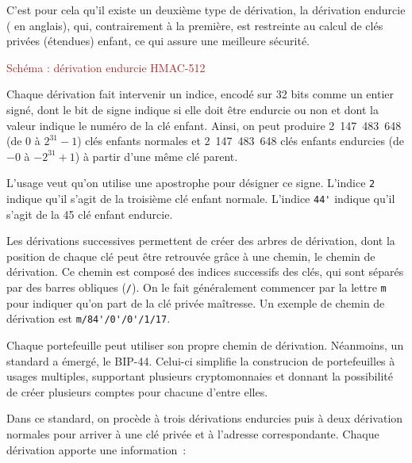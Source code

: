 C'est pour cela qu'il existe un deuxième type de dérivation, la dérivation endurcie ( en anglais), qui, contrairement à la première, est restreinte au calcul de clés privées (étendues) enfant, ce qui assure une meilleure sécurité.

\textcolor{brown}{Schéma : dérivation endurcie HMAC-512}

Chaque dérivation fait intervenir un indice, encodé sur 32 bits comme un entier signé, dont le bit de signe indique si elle doit être endurcie ou non et dont la valeur indique le numéro de la clé enfant. Ainsi, on peut produire 2~147~483~648 (de $0$ à $2^{31} - 1$) clés enfants normales et 2~147~483~648 clés enfants endurcies (de $-0$ à $- 2^{31} + 1$) à partir d'une même clé parent.

L'usage veut qu'on utilise une apostrophe pour désigner ce signe. L'indice \verb?2? indique qu'il s'agit de la troisième clé enfant normale. L'indice \verb?44'? indique qu'il s'agit de la 45\ieme{} clé enfant endurcie.


Les dérivations successives permettent de créer des arbres de dérivation, dont la position de chaque clé peut être retrouvée grâce à une chemin, le chemin de dérivation. Ce chemin est composé des indices successifs des clés, qui sont séparés par des barres obliques (\verb?/?). On le fait généralement commencer par la lettre \verb?m? pour indiquer qu'on part de la clé privée maîtresse. Un exemple de chemin de dérivation est \verb?m/84'/0'/0'/1/17?.

Chaque portefeuille peut utiliser son propre chemin de dérivation. Néanmoins, un standard a émergé, le BIP-44. Celui-ci simplifie la construcion de portefeuilles à usages multiples, supportant plusieurs cryptomonnaies et donnant la possibilité de créer plusieurs comptes pour chacune d'entre elles.

Dans ce standard, on procède à trois dérivations endurcies puis à deux dérivation normales pour arriver à une clé privée et à l'adresse correspondante. Chaque dérivation apporte une information~:

